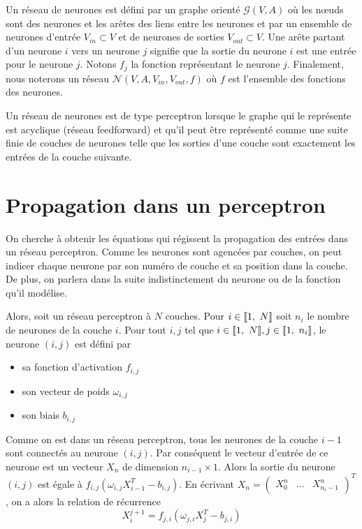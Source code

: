 \begin{definition} 
Un réseau de neurones est défini par un graphe orienté $\mathcal{G}(V, A)$ où les n\oe{}uds sont des neurones et les arêtes des liens entre les neurones et par un ensemble de neurones d'entrée $V_{in} \subset V$ et de neurones de sorties $V_{out} \subset V$. Une arête partant d'un neurone $i$ vers un neurone $j$ signifie que la sortie du neurone $i$ est une entrée pour le neurone $j$. Notons $f_{j}$ la fonction représentant le neurone $j$. Finalement, nous noterons un réseau $\mathcal{N}(V, A, V_{in}, V_{out}, f)$ où $f$ est l'ensemble des fonctions des neurones.\\
\end{definition}

\begin{definition}[Perceptron]
Un réseau de neurones est de type perceptron lorsque le graphe qui le représente est acyclique (réseau feedforward) et qu'il peut être représenté comme une suite finie de couches de neurones telle que les sorties d'une couche sont exactement les entrées de la couche suivante.
\end{definition} 

\section{Propagation dans un perceptron}

On cherche à obtenir les équations qui régissent la propagation des entrées dans un réseau perceptron. Comme les neurones sont agencées par couches, on peut indicer chaque neurone par son numéro de couche et sa position dans la couche. De plus, on parlera dans la suite indistinctement du neurone ou de la fonction qu'il modélise. 

Alors, soit un réseau perceptron à $N$ couches. Pour $i \in \llbracket 1,\ N \rrbracket$ soit $n_i$ le nombre de neurones de la couche $i$. Pour tout $i,j $ tel que $i \in \llbracket 1,\ N \rrbracket, j \in \llbracket 1,\ n_i \rrbracket$, le neurone $(i,j)$ est défini par 
\begin{itemize}
  \item sa fonction d'activation $f_{i,j}$ 
  \item son vecteur de poids $\omega_{i,j}$
  \item son biais $b_{i,j}$
\end{itemize}

Comme on est dans un réseau perceptron, tous les neurones de la couche $i-1$ sont connectés au neurone $(i,j)$. Par conséquent le vecteur d'entrée de ce neurone est un vecteur $X_n$ de dimension $n_{i-1} \times 1$. Alors la sortie du neurone $(i,j)$ est égale à $f_{i,j}(\omega_{i,j}X_{i-1}^T - b_{i,j})$. En écrivant $X_n = \begin{pmatrix}X_0^n & ... & X_{n_i-1}^n\end{pmatrix}^T$, on a alors la relation de récurrence 
\begin{equation}
  X_i^{j+1} = f_{j,i}(\omega_{j,i}X_j^T - b_{j,i})
  \label{equation_propagation_coefficients}
\end{equation}

